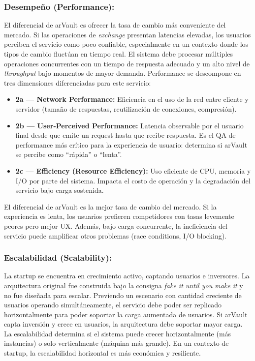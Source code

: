 \subsubsection{Desempeño (Performance):} El diferencial de arVault es ofrecer la tasa de cambio más conveniente del mercado. Si las operaciones de \textit{exchange} presentan latencias elevadas, los usuarios perciben el servicio como poco confiable, especialmente en un contexto donde los tipos de cambio fluctúan en tiempo real. El sistema debe procesar múltiples operaciones concurrentes con un tiempo de respuesta adecuado y un alto nivel de \textit{throughput} bajo momentos de mayor demanda. Performance se descompone en tres dimensiones diferenciadas para este servicio:
\begin{itemize}[leftmargin=*]
    \item \textbf{2a — Network Performance:} Eficiencia en el uso de la red entre cliente y servidor (tamaño de respuestas, reutilización de conexiones, compresión).
    \item \textbf{2b — User-Perceived Performance:} Latencia observable por el usuario final desde que emite un request hasta que recibe respuesta. Es el QA de performance más crítico para la experiencia de usuario: determina si arVault se percibe como ``rápida'' o ``lenta''.
    \item \textbf{2c — Efficiency (Resource Efficiency):} Uso eficiente de CPU, memoria y I/O por parte del sistema. Impacta el costo de operación y la degradación del servicio bajo carga sostenida.
\end{itemize}
El diferencial de arVault es la mejor tasa de cambio del mercado. Si la experiencia es lenta, los usuarios prefieren competidores con tasas levemente peores pero mejor UX. Además, bajo carga concurrente, la ineficiencia del servicio puede amplificar otros problemas (race conditions, I/O blocking).
\subsubsection{Escalabilidad (Scalability):} La startup se encuentra en crecimiento activo, captando usuarios e inversores. La arquitectura original fue construida bajo la consigna \textit{fake it until you make it} y no fue diseñada para escalar. Previendo un escenario con cantidad creciente de usuarios operando simultáneamente, el servicio debe poder ser replicado horizontalmente para poder soportar la carga aumentada de usuarios. Si arVault capta inversión y crece en usuarios, la arquitectura debe soportar mayor carga. La escalabilidad determina si el sistema puede crecer horizontalmente (más instancias) o solo verticalmente (máquina más grande). En un contexto de startup, la escalabilidad horizontal es más económica y resiliente.
